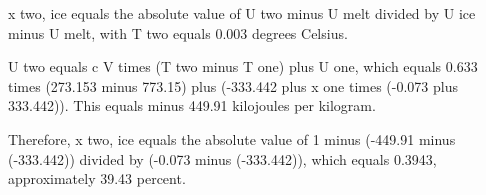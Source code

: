 x two, ice equals the absolute value of U two minus U melt divided by U ice minus U melt, with T two equals 0.003 degrees Celsius.  

U two equals c V times (T two minus T one) plus U one, which equals 0.633 times (273.153 minus 773.15) plus (-333.442 plus x one times (-0.073 plus 333.442)).  
This equals minus 449.91 kilojoules per kilogram.  

Therefore, x two, ice equals the absolute value of 1 minus (-449.91 minus (-333.442)) divided by (-0.073 minus (-333.442)), which equals 0.3943, approximately 39.43 percent.